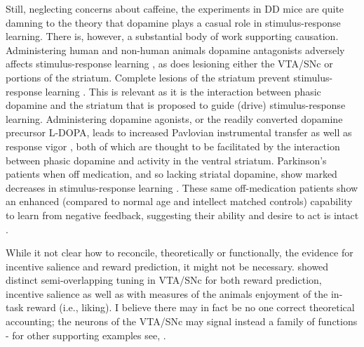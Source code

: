 \documentclass[doc,12pt]{apa}        %
\begin{document}
Still, neglecting concerns about caffeine, the experiments in DD mice are quite damning to the theory that dopamine plays a casual role in stimulus-response learning.  There is, however, a substantial body of work supporting causation.  Administering human and non-human animals dopamine antagonists adversely affects stimulus-response learning \cite{Pizzagalli:2010p7205}, as does lesioning either the VTA/SNc or portions of the striatum.  Complete lesions of the striatum prevent stimulus-response learning \cite{Packard:2002p5074}.  This is relevant as it is the interaction between phasic dopamine and the striatum that is proposed to guide (drive) stimulus-response learning. Administering dopamine agonists, or the readily converted dopamine precursor L-DOPA, leads to increased Pavlovian instrumental transfer as well as response vigor \cite{Winterbauer:2007p6352}, both of which are thought to be facilitated by the interaction between phasic dopamine and activity in the ventral striatum.  Parkinson's patients when off medication, and so lacking striatal dopamine, show marked decreases in stimulus-response learning \cite{Pizzagalli:2010p7205}.  These same off-medication patients show an enhanced (compared to normal age and intellect matched controls) capability to learn from negative feedback, suggesting their ability and desire to act is intact \cite{Frank:2004p4709}.

While it not clear how to reconcile, theoretically or functionally, the evidence for incentive salience and reward prediction, it might not be necessary.   showed distinct semi-overlapping tuning in VTA/SNc for both reward prediction, incentive salience as well as with measures of the animals enjoyment of the in-task reward (i.e., liking).  I believe there may in fact be no one correct theoretical accounting; the neurons of the VTA/SNc may signal instead a family of functions - for other supporting examples see, .


\end{document}
